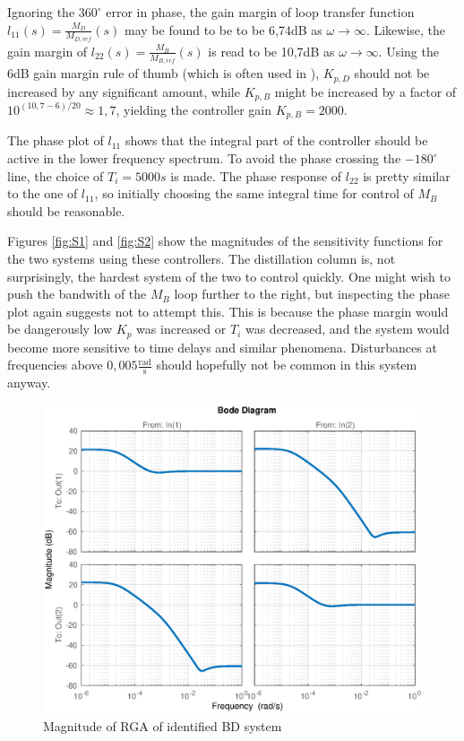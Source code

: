 \documentclass[12pt]{article}
\begin{document}
Ignoring the $360^\circ$ error in phase, the gain margin of loop transfer function $l_{11}(s) = \frac{M_D}{M_{D, ref}}(s)$ may be found to be to be 6,74dB as $\omega \rightarrow \infty$. Likewise, the gain margin of $l_{22}(s) = \frac{M_B}{M_{B, ref}}(s)$ is read to be 10,7dB as $\omega \rightarrow \infty$. Using the 6dB gain margin rule of thumb (which is often used in \cite{regtek}), $K_{p, D}$ should not be increased by any significant amount, while $K_{p, B}$ might be increased by a factor of $10^{(10,7-6)/20} \approx 1,7$, yielding the controller gain $K_{p, B} = 2000$.

The phase plot of $l_{11}$ shows that the integral part of the controller should be active in the lower frequency spectrum. To avoid the phase crossing the $-180^\circ$ line, the choice of $T_i = 5000s$ is made. The phase response of $l_{22}$ is pretty similar to the one of $l_{11}$, so initially choosing the same integral time for control of $M_B$ should be reasonable.

Figures \ref{fig:S1} and \ref{fig:S2} show the magnitudes of the sensitivity functions for the two systems using these controllers. The distillation column is, not surprisingly, the hardest system of the two to control quickly. One might wish to push the bandwith of the $M_B$ loop further to the right, but inspecting the phase plot again suggests not to attempt this. This is because the phase margin would be dangerously low $K_p$ was increased or $T_i$ was decreased, and the system would become more sensitive to time delays and similar phenomena. Disturbances at frequencies above $0,005 \frac{\textrm{rad}}{\textrm{s}}$ should hopefully not be common in this system anyway.


\begin{figure}[p]
\centering
\includegraphics[width=\textwidth]{../Systemanalyse/Log_Data_to_Matlab/Figurer/Identifisering/BD_RGA.eps}
\caption{Magnitude of RGA of identified BD system}
\label{fig:BD_RGA}
\end{figure}
\end{document}
